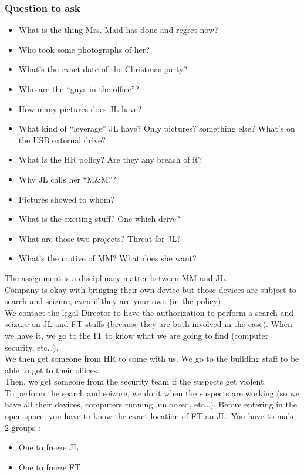 \subsubsection{Question to ask}
\begin{itemize}
	\item What is the thing Mrs. Maid has done and regret now?
	\item Who took some photographs of her?
	\item What's the exact date of the Christmas party?
	\item Who are the \enquote{guys in the office}?
	\item How many pictures does JL have?
	\item What kind of \enquote{leverage} JL have? Only pictures? something else? What's on the USB external drive?
	\item What is the HR policy? Are they any breach of it?
	\item Why JL calls her \enquote{M\&M}?
	\item Pictures showed to whom?
	\item What is the exciting stuff? One which drive?
	\item What are those two projects? Threat for JL?
	\item What's the motive of MM? What does she want?
\end{itemize}
The assignment is a disciplinary matter between MM and JL.\\
Company is okay with bringing their own device but those devices are subject to search and seizure, even if they are your own (in the policy).\\
We contact the legal Director to have the authorization to perform a search and seizure on JL and FT stuffs (because they are both involved in the case). When we have it, we go to the IT to know what we are going to find (computer security, etc\ldots).\\
We then get someone from HR to come with us. We go to the building staff to be able to get to their offices.\\
Then, we get someone from the security team if the suspects get violent.\\
To perform the search and seizure, we do it when the suspects are working (so we have all their devices, computers running, unlocked, etc\ldots). Before entering in the open-space, you have to know the exact location of FT an JL. You have to make 2 groups : 
\begin{itemize}
	\item One to freeze JL
	\item One to freeze FT
\end{itemize}

